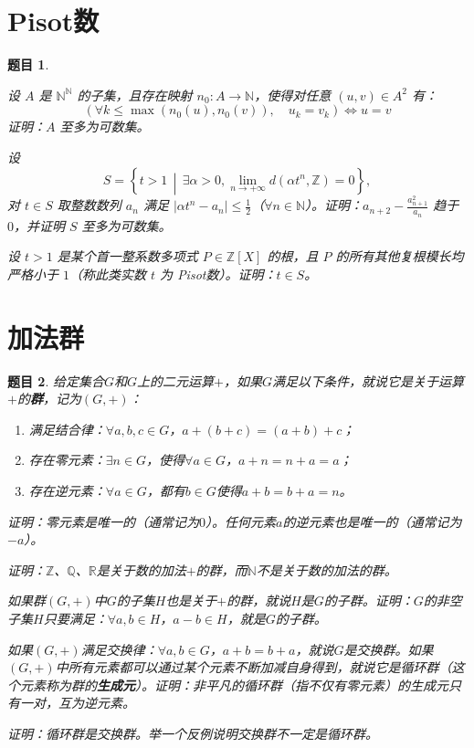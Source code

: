 \documentclass[12pt,UTF8,fontset=none]{ctexbook}
\theoremstyle{exercisestyle}
\newtheorem*{exercise}{题目}
\theoremstyle{solutionstyle}
\begin{document}
\section{Pisot数}
\begin{exercise}
  \begin{subquestions}
    \item 设 $A$ 是 $\mathbb{N}^{\mathbb{N}}$ 的子集，且存在映射 $n_0: A \to \mathbb{N}$，使得对任意 $(u, v) \in A^2$ 有：
    $$
    (\forall k \leq \max(n_0(u), n_0(v)), \quad u_k = v_k) \iff u = v
    $$
    证明：$A$ 至多为可数集。

    \item 设 
    $$S = \left\{ t > 1 \,\middle|\, \exists \alpha > 0, \lim_{n \to +\infty} d(\alpha t^n, \mathbb{Z}) = 0 \right\},$$
    对 $t \in S$ 取整数数列 $a_n$ 满足 $|\alpha t^n - a_n| \leq \frac{1}{2}$（$\forall n \in \mathbb{N}$）。证明：$a_{n+2} - \frac{a_{n+1}^2}{a_n}$ 趋于 $0$，并证明 $S$ 至多为可数集。

    \item 设 $t > 1$ 是某个首一整系数多项式 $P \in \mathbb{Z}[X]$ 的根，且 $P$ 的所有其他复根模长均严格小于 $1$（称此类实数 $t$ 为 \emph{Pisot数}）。证明：$t \in S$。
  \end{subquestions}
\end{exercise}

\section{加法群}
\begin{exercise}
    给定集合$G$和$G$上的二元运算$+$，如果$G$满足以下条件，就说它是关于运算$+$的\textbf{群}，记为$(G,+)$：
    \begin{enumerate}[label=\arabic*.]
        \item 满足结合律：$\forall a, b, c \in G$，$a + (b + c) = (a + b) + c$；
        \item 存在零元素：$\exists n \in G$，使得$\forall a \in G$，$a + n = n + a = a$；
        \item 存在逆元素：$\forall a \in G$，都有$b \in G$使得$a + b = b + a = n$。
    \end{enumerate}
    \begin{subquestions}
        \item 证明：零元素是唯一的（通常记为$0$）。任何元素$a$的逆元素也是唯一的（通常记为$-a$）。
        \item 证明：$\mathbb{Z}$、$\mathbb{Q}$、$\mathbb{R}$是关于数的加法$+$的群，而$\mathbb{N}$不是关于数的加法的群。
        \item 如果群$(G, +)$中$G$的子集$H$也是关于$+$的群，就说$H$是$G$的子群。证明：$G$的非空子集$H$只要满足：$\forall a, b \in H$，$a - b \in H$，就是$G$的子群。
        \item 如果$(G,+)$满足交换律：$\forall a, b \in G$，$a + b = b + a$，就说$G$是交换群。如果$(G,+)$中所有元素都可以通过某个元素不断加减自身得到，就说它是循环群（这个元素称为群的\textbf{生成元}）。证明：非平凡的循环群（指不仅有零元素）的生成元只有一对，互为逆元素。
        \item 证明：循环群是交换群。举一个反例说明交换群不一定是循环群。
    \end{subquestions}
\end{exercise}
\end{document}
